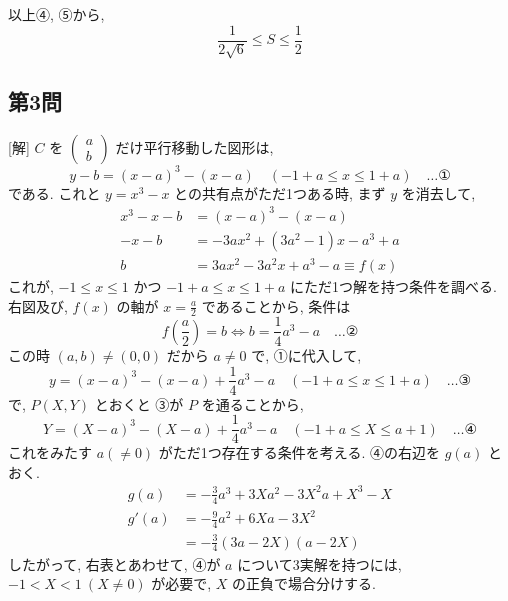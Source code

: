 \documentclass[../main.tex]{subfiles}
\begin{document}
\begin{center}
\end{center}

以上④, ⑤から,
\[
  \frac{1}{2\sqrt{6}} \le S \le \frac{1}{2}
\]

\subsection*{第3問}

[解] $C$ を $
\begin{pmatrix} a \\ b
\end{pmatrix}$ だけ平行移動した図形は,
\[
  y-b = (x-a)^3 - (x-a) \quad (-1+a \le x \le 1+a) \quad \dots \text{①}
\]
である. これと $y=x^3-x$ との共有点がただ1つある時, まず $y$ を消去して,
\begin{align*}
  x^3 - x - b &= (x-a)^3 - (x-a) \\
  -x - b &= -3a x^2 + (3a^2-1) x - a^3 + a \\
  b &= 3a x^2 - 3a^2 x + a^3 - a \equiv f(x)
\end{align*}
これが, $-1 \le x \le 1$ かつ $-1+a \le x \le 1+a$ にただ1つ解を持つ条件を調べる.
右図及び, $f(x)$ の軸が $x = \frac{a}{2}$ であることから, 条件は
\[
  f\left(\frac{a}{2}\right) = b \iff b = \frac{1}{4}a^3 - a \quad \dots \text{②}
\]
この時 $(a,b) \ne (0,0)$ だから $a \ne 0$ で, ①に代入して,
\[
  y = (x-a)^3 - (x-a) + \frac{1}{4}a^3 - a \quad (-1+a \le x \le 1+a) \quad \dots \text{③}
\]
で, $P(X, Y)$ とおくと ③が $P$ を通ることから,
\[
  Y = (X-a)^3 - (X-a) + \frac{1}{4}a^3 - a \quad (-1+a \le X \le a+1) \quad \dots \text{④}
\]
これをみたす $a(\ne 0)$ がただ1つ存在する条件を考える. ④の右辺を $g(a)$ とおく.
\begin{align*}
  g(a) &= -\frac{3}{4}a^3 + 3X a^2 - 3X^2 a + X^3 - X \\
  g'(a) &= -\frac{9}{4}a^2 + 6X a - 3X^2 \\
  &= -\frac{3}{4}(3a-2X)(a-2X)
\end{align*}
したがって, 右表とあわせて, ④が $a$ について3実解を持つには, $-1 < X < 1 \ (X \ne 0)$ が必要で, $X$ の正負で場合分けする.
\end{document}
